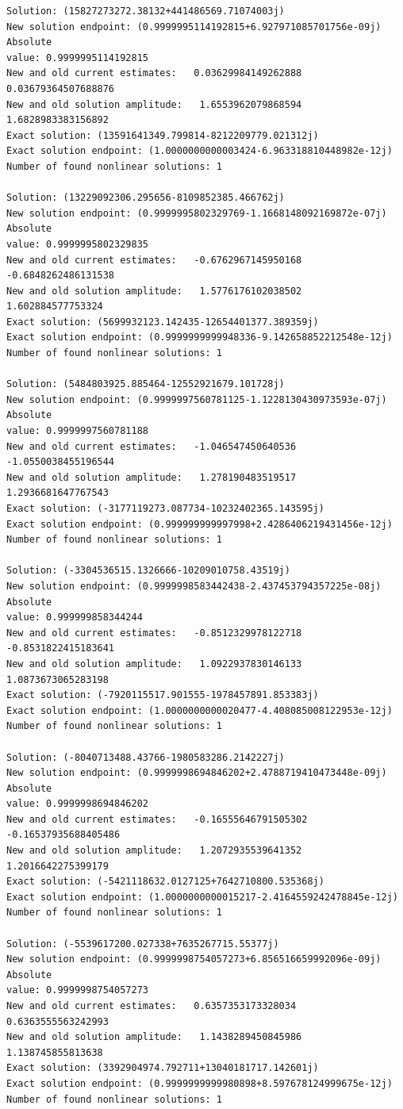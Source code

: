 \documentclass[11pt]{article}
\begin{document}
\begin{Verbatim}[commandchars=\\\{\}]
Solution: (15827273272.38132+441486569.71074003j)
New solution endpoint: (0.9999995114192815+6.927971085701756e-09j) Absolute
value: 0.9999995114192815
New and old current estimates:   0.03629984149262888    0.03679364507688876
New and old solution amplitude:   1.6553962079868594    1.6828983383156892
Exact solution: (13591641349.799814-8212209779.021312j)
Exact solution endpoint: (1.0000000000003424-6.963318810448982e-12j)
Number of found nonlinear solutions: 1

Solution: (13229092306.295656-8109852385.466762j)
New solution endpoint: (0.9999995802329769-1.1668148092169872e-07j) Absolute
value: 0.9999995802329835
New and old current estimates:   -0.6762967145950168    -0.6848262486131538
New and old solution amplitude:   1.5776176102038502    1.602884577753324
Exact solution: (5699932123.142435-12654401377.389359j)
Exact solution endpoint: (0.9999999999948336-9.142658852212548e-12j)
Number of found nonlinear solutions: 1

Solution: (5484803925.885464-12552921679.101728j)
New solution endpoint: (0.9999997560781125-1.1228130430973593e-07j) Absolute
value: 0.9999997560781188
New and old current estimates:   -1.046547450640536    -1.0550038455196544
New and old solution amplitude:   1.278190483519517    1.2936681647767543
Exact solution: (-3177119273.087734-10232402365.143595j)
Exact solution endpoint: (0.999999999997998+2.4286406219431456e-12j)
Number of found nonlinear solutions: 1

Solution: (-3304536515.1326666-10209010758.43519j)
New solution endpoint: (0.9999998583442438-2.437453794357225e-08j) Absolute
value: 0.999999858344244
New and old current estimates:   -0.8512329978122718    -0.8531822415183641
New and old solution amplitude:   1.0922937830146133    1.0873673065283198
Exact solution: (-7920115517.901555-1978457891.853383j)
Exact solution endpoint: (1.0000000000020477-4.408085008122953e-12j)
Number of found nonlinear solutions: 1

Solution: (-8040713488.43766-1980583286.2142227j)
New solution endpoint: (0.9999998694846202+2.4788719410473448e-09j) Absolute
value: 0.9999998694846202
New and old current estimates:   -0.16555646791505302    -0.16537935688405486
New and old solution amplitude:   1.2072935539641352    1.2016642275399179
Exact solution: (-5421118632.0127125+7642710800.535368j)
Exact solution endpoint: (1.0000000000015217-2.4164559242478845e-12j)
Number of found nonlinear solutions: 1

Solution: (-5539617200.027338+7635267715.55377j)
New solution endpoint: (0.9999998754057273+6.856516659992096e-09j) Absolute
value: 0.9999998754057273
New and old current estimates:   0.6357353173328034    0.6363555563242993
New and old solution amplitude:   1.1438289450845986    1.138745855813638
Exact solution: (3392904974.792711+13040181717.142601j)
Exact solution endpoint: (0.9999999999980898+8.597678124999675e-12j)
Number of found nonlinear solutions: 1


\end{Verbatim}
\end{document}
